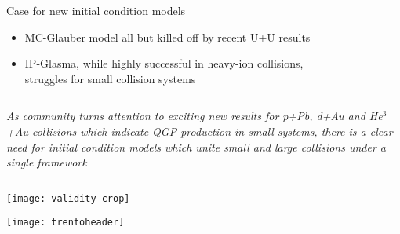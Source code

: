 \documentclass[svgnames]{beamer}
\begin{document}
\begin{frame}{Case for new initial condition models}
\vspace{0.15 in}
\begin{itemize}
 \item MC-Glauber model all but killed off by recent U+U results
 \vspace{0.1 in}
 \item IP-Glasma, while highly successful in heavy-ion collisions, \\struggles for small collision systems
\end{itemize}
\vspace{0.1 in}
\begin{columns}
 \begin{column}{0.85\textwidth}
   \emph{
   As community turns attention to exciting new results for p+Pb, d+Au and He$^3$+Au collisions which indicate QGP production in small systems, there is a clear need
   for initial condition models which unite small and large collisions under a single framework}
 \end{column}
\end{columns}

\centering
\vspace{0.1 in}
\texttt{[image: validity-crop]}
\vspace{0.1 in}
\end{frame}

\begin{frame}
 \centering
 \texttt{[image: trentoheader]}
\end{frame}
\end{document}

